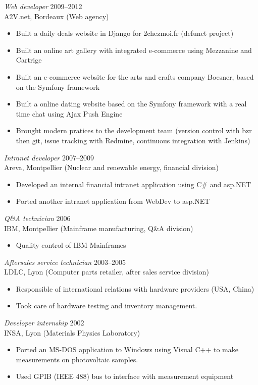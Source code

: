 \documentclass[margin]{res}
\begin{document}
\begin{resume}
{\sl Web developer\/} \hfill 2009--2012 \\
A2V.net, Bordeaux (Web agency)
\begin{itemize}  \itemsep -2pt
    \item Built a daily deals website in Django for 2chezmoi.fr (defunct project)
    \item Built an online art gallery with integrated e-commerce using Mezzanine and Cartrige
    \item Built an e-commerce website for the arts and crafts company Boesner, based on the Symfony framework
    \item Built a online dating website based on the Symfony framework with a real time chat using Ajax Push Engine
    \item Brought modern pratices to the development team (version control with bzr then git,
        issue tracking with Redmine, continuous integration with Jenkins)
\end{itemize}

{\sl Intranet developer\/} \hfill 2007--2009 \\
Areva, Montpellier (Nuclear and renewable energy, financial division)
\begin{itemize} \itemsep -2pt
    \item Developed an internal financial intranet application using C\# and asp.NET
    \item Ported another intranet application from WebDev to asp.NET
\end{itemize}

{\sl Q\&A technician\/} \hfill 2006 \\
IBM, Montpellier (Mainframe manufacturing, Q\&A division)
\begin{itemize}  \itemsep -2pt
    \item Quality control of IBM Mainframes
\end{itemize}

{\sl Aftersales service technician\/} \hfill     2003--2005 \\
LDLC, Lyon (Computer parts retailer, after sales service division)
\begin{itemize}  \itemsep -2pt
    \item Responsible of international relations with hardware providers (USA, China)
    \item Took care of hardware testing and inventory management.
\end{itemize}

{\sl Developer internship\/} \hfill 2002 \\
INSA, Lyon (Materials Physics Laboratory)
\begin{itemize} \itemsep -2pt
    \item Ported an MS-DOS application to Windows using Visual C++ to make
    measurements on photovoltaic samples.
    \item Used GPIB (IEEE 488) bus to interface with measurement equipment
\end{itemize}


\end{resume}
\end{document}
